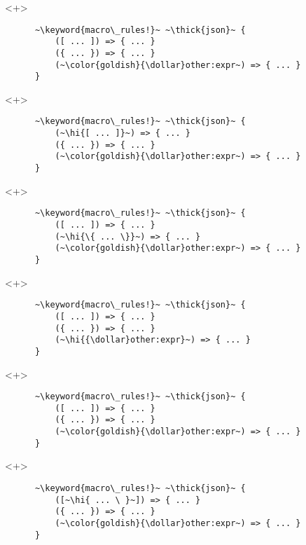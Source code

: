 \documentclass[usepdftitle=false]{beamer}
\newcommand{\dollar}{\makebox[\widthof{\$}][c]{\$}}
\newcommand{\thick}[1]{\contourlength{0.16pt}\contour[10]{black}{#1}}
\newcommand{\hi}[1]{%
\tikz[baseline=(A.base)]
 \node[highlighting=yellowbg,inner sep=0pt,text depth=0pt] (A) {#1};%
}
\newcommand{\keyword}[1]{\color{greenish}#1}
\begin{document}
\begin{frame}[fragile]
  \begin{onlyenv}<+>
    \begin{verbatim}
      ~\keyword{macro\_rules!}~ ~\thick{json}~ {
          ([ ... ]) => { ... }
          ({ ... }) => { ... }
          (~\color{goldish}{\dollar}other:expr~) => { ... }
      }
    \end{verbatim}
  \end{onlyenv}
  \begin{onlyenv}<+>
    \begin{verbatim}
      ~\keyword{macro\_rules!}~ ~\thick{json}~ {
          (~\hi{[ ... ]}~) => { ... }
          ({ ... }) => { ... }
          (~\color{goldish}{\dollar}other:expr~) => { ... }
      }
    \end{verbatim}
  \end{onlyenv}
  \begin{onlyenv}<+>
    \begin{verbatim}
      ~\keyword{macro\_rules!}~ ~\thick{json}~ {
          ([ ... ]) => { ... }
          (~\hi{\{ ... \}}~) => { ... }
          (~\color{goldish}{\dollar}other:expr~) => { ... }
      }
    \end{verbatim}
  \end{onlyenv}
  \begin{onlyenv}<+>
    \begin{verbatim}
      ~\keyword{macro\_rules!}~ ~\thick{json}~ {
          ([ ... ]) => { ... }
          ({ ... }) => { ... }
          (~\hi{{\dollar}other:expr}~) => { ... }
      }
    \end{verbatim}
  \end{onlyenv}
  \begin{onlyenv}<+>
    \begin{verbatim}
      ~\keyword{macro\_rules!}~ ~\thick{json}~ {
          ([ ... ]) => { ... }
          ({ ... }) => { ... }
          (~\color{goldish}{\dollar}other:expr~) => { ... }
      }
    \end{verbatim}
  \end{onlyenv}
  \begin{onlyenv}<+>
    \begin{verbatim}
      ~\keyword{macro\_rules!}~ ~\thick{json}~ {
          ([~\hi{ ... \ }~]) => { ... }
          ({ ... }) => { ... }
          (~\color{goldish}{\dollar}other:expr~) => { ... }
      }
    \end{verbatim}
  \end{onlyenv}
\end{frame}
\end{document}
